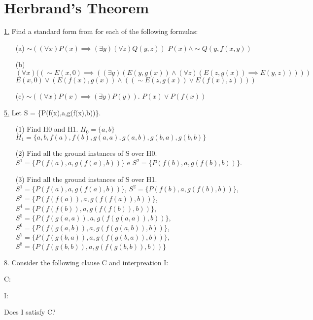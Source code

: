\section{Herbrand's Theorem}

\underline{1.} Find a standard form from for each of the following formulas:
\begin{itemize}
 \item[(a)] $ \sim ((\forall x) P(x) \implies (\exists y) (\forall z) Q(y,z)) $ \newline
$ P(x) \wedge \sim Q(y, f(x, y)) $
 \item[(b)] $ (\forall x)((\sim E(x,0)\implies((\exists y)(E(y,g(x)) \wedge (\forall z)(E(z,g(x)) \implies E(y,z))))) $ \newline
$ E(x,0) \vee (E(f(x),g(x)) \wedge ( (\sim E(z,g(x)) \vee E(f(x),z))) )$
 \item[(c)] $ \sim((\forall x)P(x) \implies(\exists y)P(y)) $.
 \newline
$ P(x) \vee P(f(x)) $
\end{itemize}

\underline{5.} Let S = \{P(f(x),a,g(f(x),b))\}.
\begin{itemize}
 \item[(1)] Find H0 and H1. \newline
$ H_0 = \{ a, b \} $ \newline
$ H_1 = \{ a, b, f(a), f(b), g(a, a), g(a, b), g(b, a), g(b, b) \} $ \newline
 \item[(2)] Find all the ground instances of S over H0.
$ S^1 = \{P(f(a),a,g(f(a),b))\} $ e $ S^2 = \{P(f(b),a,g(f(b),b))\} $.
 \item[(3)] Find all the ground instances of S over H1. \newline
$ S^1 = \{P(f(a),a,g(f(a),b))\} $, $ S^2 = \{P(f(b),a,g(f(b),b))\} $, $ S^3 = \{P(f(f(a)),a,g(f(f(a)),b))\} $, $ S^4 = \{P(f(f(b)),a,g(f(f(b)),b))\} $, $ S^5 = \{P(f(g(a,a)),a,g(f(g(a,a)),b))\} $, $ S^6 = \{P(f(g(a,b)),a,g(f(g(a,b)),b))\} $, $ S^7 = \{P(f(g(b,a)),a,g(f(g(b,a)),b))\} $, $ S^8 = \{P(f(g(b,b)),a,g(f(g(b,b)),b))\} $
\end{itemize}

8. Consider the following clause C and interpreation I:

C:

I:

Does I satisfy C?

